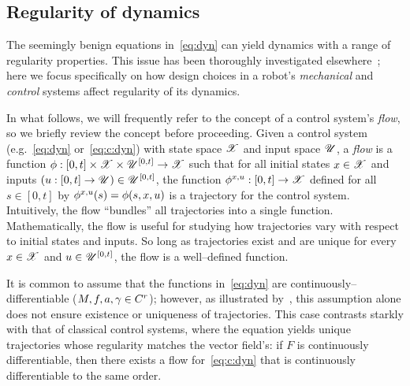 \documentclass{article}
\begin{document}
\subsection{Regularity of dynamics}
\label{sec:reg:dyn}
The seemingly benign equations in~\eqref{eq:dyn} 
can yield dynamics with a range of regularity properties.
This issue has been thoroughly investigated elsewhere~\cite{Pace2017-tt, Pace2017-ph, Ballard2000-ui};
here we focus specifically on how design choices in a robot's \emph{mechanical} and \emph{control} systems affect regularity of its dynamics.

In what follows, we will frequently refer to the concept of a control system's \emph{flow}, so we briefly review the concept before proceeding.
Given a control system (e.g.~\eqref{eq:dyn} or~\eqref{eq:c:dyn}) with state space $\mathscr{X}$ and input space $\mathscr{U}$, 
a \emph{flow} is a function
$\phi:[0,t]\times\mathscr{X}\times\mathscr{U}^{[0,t]}\rightarrow\mathscr{X}$
such that for all initial states $x\in\mathscr{X}$ and inputs $\left( u:[0,t]\rightarrow\mathscr{U} \right)\in\mathscr{U}^{[0,t]}$,
the function 
$\phi^{x,u}:[0,t]\rightarrow\mathscr{X}$ 
defined for all $s\in[0,t]$ by 
$\phi^{x,u}(s) = \phi(s,x,u)$
is a trajectory for the control system.
Intuitively, the flow ``bundles'' all trajectories into a single function.
Mathematically, the flow is useful for studying how trajectories vary with respect to initial states and inputs.
So long as trajectories exist and are unique for every $x\in\mathscr{X}$ and $u\in\mathscr{U}^{[0,t]}$, the flow is a well--defined function.

It is common to assume that the functions in~\eqref{eq:dyn} are continuously--differentiable ($M, f, a, \gamma\in C^r$); however, as illustrated by~\cite[Ex.~2]{Ballard2000-ui}, this assumption alone does not ensure existence or uniqueness of trajectories.
This case contrasts starkly with that of classical 
control systems, where the equation
yields unique trajectories whose regularity matches the vector field's:
if $F$ is continuously differentiable,
then 
there exists a flow for~\eqref{eq:c:dyn} that is 
continuously differentiable to the same order.
\end{document}
